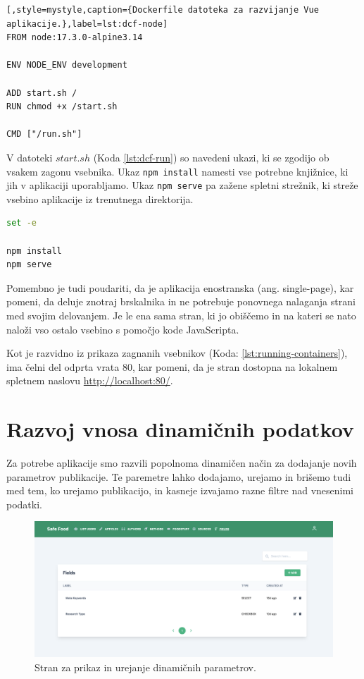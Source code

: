 \documentclass[a4paper, 12pt]{book}
\begin{document}
\begin{lstlisting}[,style=mystyle,caption={Dockerfile datoteka za razvijanje Vue aplikacije.},label=lst:dcf-node]
FROM node:17.3.0-alpine3.14

ENV NODE_ENV development

ADD start.sh /
RUN chmod +x /start.sh

CMD ["/run.sh"]
\end{lstlisting}

V datoteki $start.sh$ (Koda \ref{lst:dcf-run}) so navedeni ukazi, ki se zgodijo ob vsakem zagonu vsebnika. Ukaz \texttt{npm install} namesti vse potrebne knjižnice, ki jih v aplikaciji uporabljamo. Ukaz \texttt{npm serve} pa zažene spletni strežnik, ki streže vsebino aplikacije iz trenutnega direktorija.

\begin{lstlisting}[language=bash,style=mystyle,caption={Ukazna datoteka, ki naloži potrebne knjižnice in streže aplikacijo.},label=lst:dcf-run]
set -e

npm install
npm serve
\end{lstlisting}

Pomembno je tudi poudariti, da je aplikacija enostranska (ang. single-page), kar pomeni, da deluje znotraj brskalnika in ne potrebuje ponovnega nalaganja strani med svojim delovanjem. Je le ena sama stran, ki jo obiščemo in na kateri se nato naloži vso ostalo vsebino s pomočjo kode JavaScripta.

Kot je razvidno iz prikaza zagnanih vsebnikov (Koda: \ref{lst:running-containers}), ima čelni del odprta vrata 80, kar pomeni, da je stran dostopna na lokalnem spletnem naslovu \url{http://localhost:80/}. 

\section{Razvoj vnosa dinamičnih podatkov}
Za potrebe aplikacije smo razvili popolnoma dinamičen način za dodajanje novih parametrov publikacije. Te paremetre lahko dodajamo, urejamo in brišemo tudi med tem, ko urejamo publikacijo, in kasneje izvajamo razne filtre nad vnesenimi podatki.

\begin{figure}[h]
\begin{center}
\includegraphics[width=1\textwidth]{slike/fields-list.png}
\end{center}
\caption{ Stran za prikaz in urejanje dinamičnih parametrov. }
\label{fields-list}
\end{figure}
\end{document}

